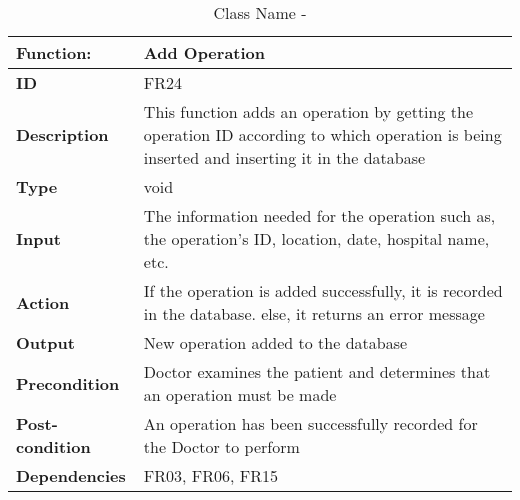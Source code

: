 \documentclass[]{article}
\begin{document}
\FloatBarrier
\begin{table}[h]
\caption{Class Name - }
\label{tab:my-table}
\begin{tabular}{|p{}|p{}|}
\hline
\textbf{Function:} & Add Operation
\\ \hline
\textbf{ID}  & FR24         

\\ \hline
\textbf{Description}    &  This function adds an operation by getting the operation ID according to which operation is being inserted and inserting it in the database                                                               
\\ \hline
\textbf{Type}    & void    

\\ \hline
\textbf{Input}        & The information needed for the operation such as, the operation's ID, location, date, hospital name, etc.


\\ \hline
\textbf{Action}            &  If the operation is added successfully, it is recorded in the database. else, it returns an error message

\\ \hline
\textbf{Output}            & New operation added to the database

\\ \hline
\textbf{Precondition}           &  Doctor examines the patient and determines that an operation must be made

\\ \hline
\textbf{Post-condition}           & An operation has been successfully recorded for the Doctor to perform


\\ \hline
\textbf{Dependencies}           & FR03, FR06, FR15
\\ \hline
\end{tabular}
\end{table}
\end{document}
